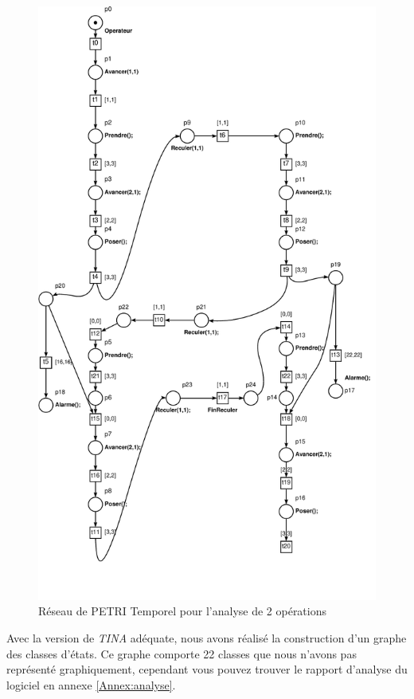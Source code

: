 \begin{figure}[!ht]
\centering
\includegraphics[height = .78\textheight]{./II/images/reseau-AnalyseIII-2.pdf}
\caption{Réseau de PETRI Temporel pour l'analyse de 2 opérations}\label{fig:RdpAnalyseIII-2}
\end{figure}

Avec la version de \emph{TINA} adéquate, nous avons réalisé la construction d'un graphe des classes d'états. Ce graphe comporte 22 classes que nous n'avons pas représenté graphiquement, cependant vous pouvez trouver le rapport d'analyse du logiciel en annexe \ref{Annex:analyse}. 

